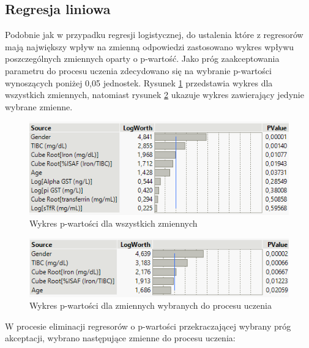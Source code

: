\subsection{Regresja liniowa}

Podobnie jak w przypadku regresji logistycznej, do ustalenia które z regresorów mają największy wpływ na zmienną odpowiedzi zastosowano wykres wpływu poszczególnych zmiennych oparty o p-wartość. Jako próg zaakceptowania parametru do procesu uczenia zdecydowano się na wybranie p-wartości wynoszących poniżej 0,05 jednostek. Rysunek \ref{fig:pvalue3} przedstawia wykres dla wszystkich zmiennych, natomiast rysunek \ref{fig:pvalue4} ukazuje wykres zawierający jedynie wybrane zmienne. 

\begin{figure}[!ht]
	\centering
	\includegraphics[width=\linewidth]{Rozdzial3/pvalue3}
	\caption{Wykres p-wartości dla wszystkich zmiennych}
	\label{fig:pvalue3}
\end{figure}

\begin{figure}[!ht]
	\centering
	\includegraphics[width=\linewidth]{Rozdzial3/pvalue4}
	\caption{Wykres p-wartości dla zmiennych wybranych do procesu uczenia}
	\label{fig:pvalue4}
\end{figure}

W procesie eliminacji regresorów o p-wartości przekraczającej wybrany próg akceptacji, wybrano następujące zmienne do procesu uczenia:

